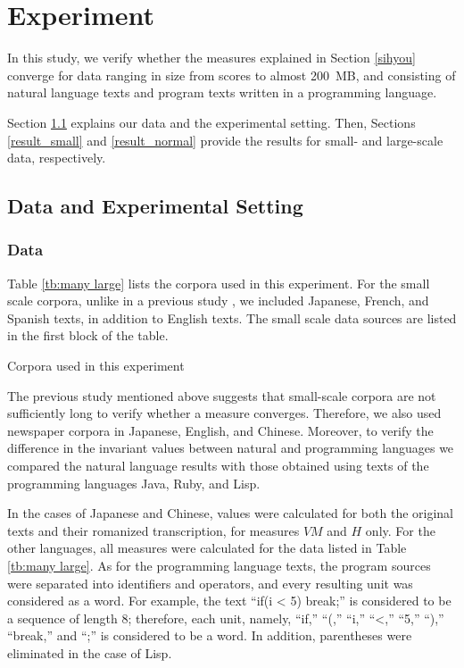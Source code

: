 \documentclass[english]{jnlp_1.4_rep}
\begin{document}
\section{Experiment}

In this study, we verify whether the measures explained in Section \ref{sihyou} converge for data ranging in size 
from scores to almost 200~MB, and consisting of natural language texts and program texts written in a programming language. 
 
Section \ref{env} explains our data and the experimental setting. Then, Sections \ref{result_small} and \ref{result_normal} provide the results for small- and large-scale data, respectively.


\subsection{Data and Experimental Setting}
\label{env}

\subsubsection{Data}

Table \ref{tb:many large} lists the corpora used in this experiment. For the small scale corpora, unlike in a previous study \cite{BaayenTweedie}, we included Japanese, French, and Spanish texts, in addition to English texts. The small scale data sources are listed in the first block of the table. 

\begin{table}[b]
\caption{Corpora used in this experiment}
\label{tb:many large}

\end{table}

The previous study mentioned above \cite{BaayenTweedie} suggests that small-scale corpora are not sufficiently long to verify whether a measure converges. 
Therefore, we also used newspaper corpora in Japanese, English, and Chinese. Moreover, to verify 
the difference in the invariant values between natural and programming languages
we compared the natural language results with those obtained using texts of the programming languages Java, Ruby, and Lisp. 

In the cases of Japanese and Chinese, values were calculated for both the original texts and their romanized transcription, for measures $\mathit{VM}$ and $H$ only. For the other languages, all measures were calculated for the data listed in Table \ref{tb:many large}. As for the programming language texts, the program sources were separated into identifiers and operators, and every resulting unit was considered as a word. For example, the text ``if(i < 5) break;'' is considered to be a sequence of length 8; therefore, each unit, namely, ``if,'' ``(,'' ``i,'' ``<,'' ``5,'' ``),'' ``break,'' and ``;'' is considered to be a word. In addition, parentheses were eliminated in the case of Lisp. 
\end{document}
